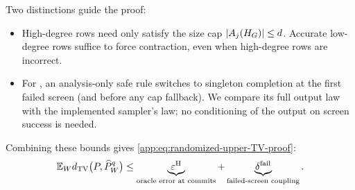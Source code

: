 {Two distinctions guide the proof:
\begin{itemize}
\item High-degree rows need only satisfy the size cap
$|A_{j}(H_{G})|\le d$.  Accurate low-degree rows suffice to
force contraction, even when high-degree rows are incorrect.
\item For \HellingerCase, an analysis-only safe rule switches to singleton
completion at the first failed screen (and before any cap fallback).
We compare its full output law with the implemented sampler's law;
no conditioning of the output on screen success is needed.
\end{itemize}
Combining these bounds gives \cref{app:eq:randomized-upper-TV-proof}:
\[
 \mathbb E_{W}
 d_{\mathrm{TV}}\bigl(P,
            \widehat P_{W}^{q}\bigr)
 \le
 \underbrace{\varepsilon^{\mathrm H}}_{\text{oracle error at commits}}
 +\underbrace{\delta^{\mathrm{fail}}}_{\text{failed-screen coupling}}.
\]
\par}





